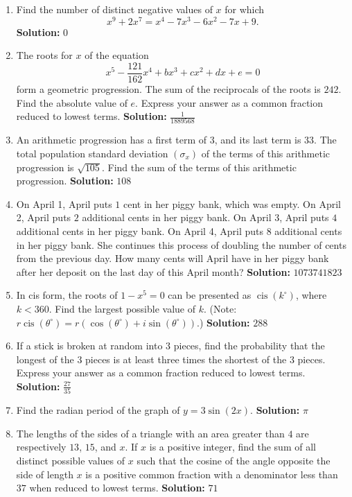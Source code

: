 \documentclass[10pt]{article}
\begin{document}
\begin{enumerate}
\item Find the number of distinct negative values of \(x\) for which
\[
x^9+2x^7=x^4-7x^3-6x^2-7x+9.
\]
\quad\textbf{Solution:} \(0\)

\item The roots for \(x\) of the equation
\[
x^5-\frac{121}{162}x^4+bx^3+cx^2+dx+e=0
\]
form a geometric progression. The sum of the reciprocals of the roots is \(242\). Find the absolute value of \(e\). Express your answer as a common fraction reduced to lowest terms. \quad\textbf{Solution:} \(\frac{1}{1889568}\)

\item An arithmetic progression has a first term of \(3\), and its last term is \(33\). The total population standard deviation \((\sigma_x)\) of the terms of this arithmetic progression is \(\sqrt{105}\). Find the sum of the terms of this arithmetic progression. \quad\textbf{Solution:} \(108\)

\item On April 1, April puts \(1\) cent in her piggy bank, which was empty. On April 2, April puts \(2\) additional cents in her piggy bank. On April 3, April puts \(4\) additional cents in her piggy bank. On April 4, April puts \(8\) additional cents in her piggy bank. She continues this process of doubling the number of cents from the previous day. How many cents will April have in her piggy bank after her deposit on the last day of this April month? \quad\textbf{Solution:} \(1073741823\)

\item In cis form, the roots of \(1-x^5=0\) can be presented as \(\operatorname{cis}(k^\circ)\), where \(k<360\). Find the largest possible value of \(k\). (Note: \(r\operatorname{cis}(\theta^\circ)=r(\cos(\theta^\circ)+i\sin(\theta^\circ))\).) \quad\textbf{Solution:} \(288\)

\item If a stick is broken at random into \(3\) pieces, find the probability that the longest of the \(3\) pieces is at least three times the shortest of the \(3\) pieces. Express your answer as a common fraction reduced to lowest terms. \quad\textbf{Solution:} \(\frac{27}{35}\)

\item Find the radian period of the graph of \(y=3\sin(2x)\). \quad\textbf{Solution:} \(\pi\)

\item The lengths of the sides of a triangle with an area greater than \(4\) are respectively \(13\), \(15\), and \(x\). If \(x\) is a positive integer, find the sum of all distinct possible values of \(x\) such that the cosine of the angle opposite the side of length \(x\) is a positive common fraction with a denominator less than \(37\) when reduced to lowest terms. \quad\textbf{Solution:} \(71\)


\end{enumerate}
\end{document}
